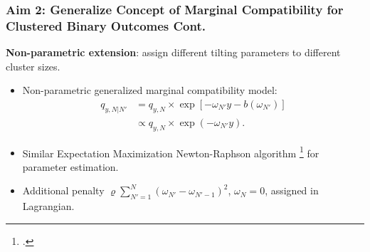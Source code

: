 \documentclass[hyperref={bookmarks=false},aspectratio=169]{beamer}
\begin{document}
\begin{frame}
\frametitle{Aim 2: Generalize Concept of Marginal Compatibility for Clustered Binary Outcomes Cont.}

\textbf{Non-parametric extension}: assign different tilting parameters to different cluster sizes.

\begin{itemize}
    \item \alert{Non-parametric generalized marginal compatibility model}:
    \begin{equation*}\label{M:NONparametricSPGLM_GMCexponentialTiltPDF}
    \begin{split}
    q_{y,N|N'} &= q_{y,N} \times \exp{ \left[ - \omega_{N'} y - b \left( \omega_{N'} \right) \right]} \\
    & \propto q_{y,N} \times \exp{ \left( - \omega_{N'} y \right)} .
    \end{split}
    \end{equation*}
    \item Similar Expectation Maximization Newton-Raphson algorithm \footcite{rathouz2008generalized} for parameter estimation.
    \item Additional penalty $\varrho \displaystyle\sum_{N'=1}^N (\omega_{N'} - \omega_{N'-1})^2$, $\omega_N=0$, assigned in Lagrangian.
\end{itemize}

\end{frame}
\end{document}
